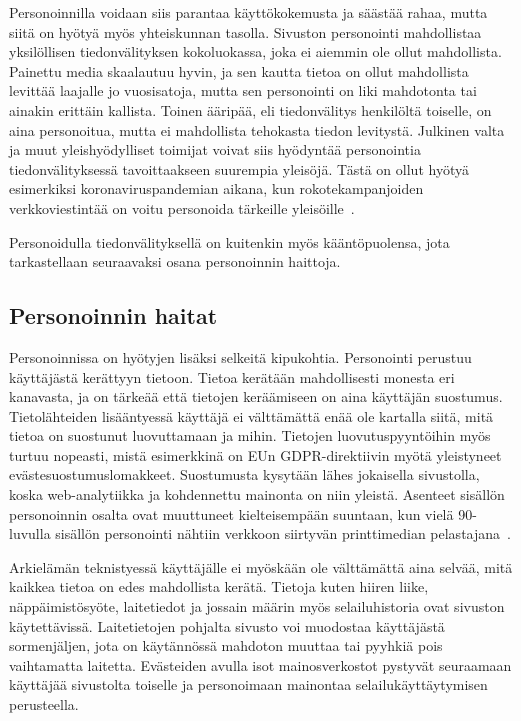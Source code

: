 \documentclass[finnish, 12pt, a4paper, elec, utf8, a-1b, online]{aaltothesis}
\begin{document}
Personoinnilla voidaan siis parantaa käyttökokemusta ja säästää rahaa, mutta
siitä on hyötyä myös yhteiskunnan tasolla. Sivuston personointi mahdollistaa
yksilöllisen tiedonvälityksen kokoluokassa, joka ei aiemmin ole ollut
mahdollista. Painettu media skaalautuu hyvin, ja sen kautta tietoa on ollut
mahdollista levittää laajalle jo vuosisatoja, mutta sen personointi on liki
mahdotonta tai ainakin erittäin kallista. Toinen ääripää, eli tiedonvälitys
henkilöltä toiselle, on aina personoitua, mutta ei mahdollista tehokasta tiedon
levitystä. Julkinen valta ja muut yleishyödylliset toimijat voivat siis
hyödyntää personointia tiedonvälityksessä tavoittaakseen suurempia yleisöjä.
Tästä on ollut hyötyä esimerkiksi koronaviruspandemian aikana, kun
rokotekampanjoiden verkkoviestintää on voitu personoida tärkeille
yleisöille~\cite{sanchez_2022}.

Personoidulla tiedonvälityksellä on kuitenkin myös kääntöpuolensa, jota
tarkastellaan seuraavaksi osana personoinnin haittoja.

\subsection{Personoinnin haitat}

Personoinnissa on hyötyjen lisäksi selkeitä kipukohtia. Personointi perustuu
käyttäjästä kerättyyn tietoon. Tietoa kerätään mahdollisesti monesta eri
kanavasta, ja on tärkeää että tietojen keräämiseen on aina käyttäjän suostumus.
Tietolähteiden lisääntyessä käyttäjä ei välttämättä enää ole kartalla siitä,
mitä tietoa on suostunut luovuttamaan ja mihin. Tietojen luovutuspyyntöihin myös
turtuu nopeasti, mistä esimerkkinä on EUn GDPR-direktiivin myötä yleistyneet
evästesuostumuslomakkeet. Suostumusta kysytään lähes jokaisella sivustolla,
koska web-analytiikka ja kohdennettu mainonta on niin yleistä. Asenteet sisällön
personoinnin osalta ovat muuttuneet kielteisempään suuntaan, kun vielä
90-luvulla sisällön personointi nähtiin verkkoon siirtyvän printtimedian
pelastajana~\cite{adams_1995}.

Arkielämän teknistyessä käyttäjälle ei myöskään ole välttämättä aina selvää,
mitä kaikkea tietoa on edes mahdollista kerätä. Tietoja kuten hiiren liike,
näppäimistösyöte, laitetiedot ja jossain määrin myös selailuhistoria ovat
sivuston käytettävissä. Laitetietojen pohjalta sivusto voi muodostaa
käyttäjästä sormenjäljen, jota on käytännössä mahdoton muuttaa tai pyyhkiä pois
vaihtamatta laitetta. Evästeiden avulla isot mainosverkostot pystyvät seuraamaan
käyttäjää sivustolta toiselle ja personoimaan mainontaa selailukäyttäytymisen
perusteella.
\end{document}
